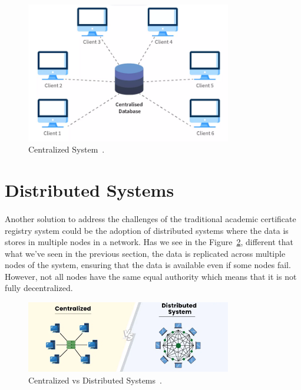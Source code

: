 \begin{figure}[H]\label{fig:centralized-system}
    \begin{center}
        \includegraphics[width=0.8\textwidth]{assets/centralized-database.png}
        \caption{Centralized System~\cite{centralizedDB}.}
    \end{center}
\end{figure}

\section{Distributed Systems}\label{subsec:distributed-systems}
\paragraph{}

Another solution to address the challenges of the traditional academic certificate registry system could be the adoption of distributed systems where the data is stores in multiple nodes in a network.
Has we see in the Figure~\ref{fig:distributed-system}, different that what we've seen in the previous section, the data is replicated across multiple nodes of the system, ensuring that the data is available even if some nodes fail. However, not all nodes have the same equal authority which means that
it is not fully decentralized.

\vspace{.25cm}
\begin{figure}[h]\label{fig:distributed-system}
    \begin{center}
        \includegraphics[width=0.8\textwidth]{assets/centralized-vs-distributed.png}
        \caption{Centralized vs Distributed Systems~\cite{centralizedVsDistributed}.}
    \end{center}
\end{figure}

